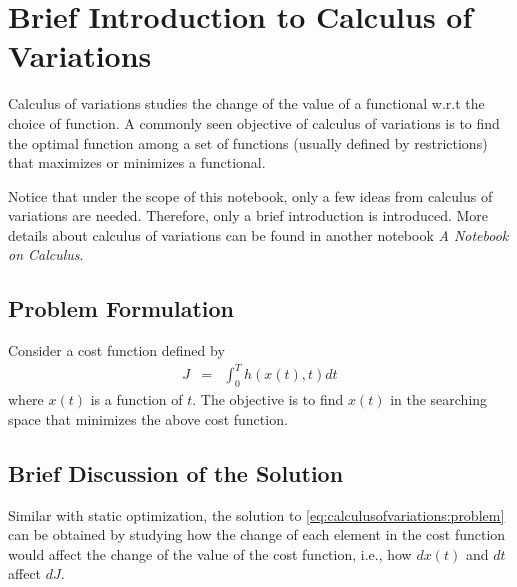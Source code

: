 \chapter{Brief Introduction to Calculus of Variations} \label{ch:calculusofvariations}

Calculus of variations studies the change of the value of a functional w.r.t the choice of function. A commonly seen objective of calculus of variations is to find the optimal function among a set of functions (usually defined by restrictions) that maximizes or minimizes a functional.

Notice that under the scope of this notebook, only a few ideas from calculus of variations are needed. Therefore, only a brief introduction is introduced. More details about calculus of variations can be found in another notebook \textit{A Notebook on Calculus}.

\section{Problem Formulation}

Consider a cost function defined by
\begin{eqnarray}
	J &=& \int_{0}^{T} h\left(x(t), t\right)dt \label{eq:calculusofvariations:problem}
\end{eqnarray}
where $x(t)$ is a function of $t$. The objective is to find $x(t)$ in the searching space that minimizes the above cost function. 

\section{Brief Discussion of the Solution}

Similar with static optimization, the solution to \eqref{eq:calculusofvariations:problem} can be obtained by studying how the change of each element in the cost function would affect the change of the value of the cost function, i.e., how $dx(t)$ and $dt$ affect $dJ$.

